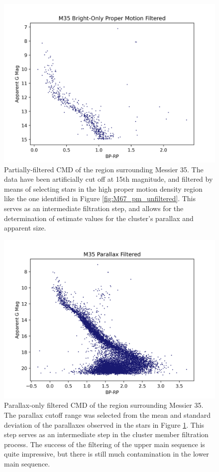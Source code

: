 \documentclass[onecolumn,table,xcdraw,super]{aastex631}
\begin{document}
\begin{figure}[]
    \centering
      \includegraphics[width=4.75in]{figures/M35_cmd_bright_filtered.png}
    \caption{Partially-filtered CMD of the region surrounding Messier 35. The data have been artificially cut off at 15th magnitude, and filtered by means of selecting stars in the high proper motion density region like the one identified in Figure \ref{fig:M67_pm_unfiltered}. This serves as an intermediate filtration step, and allows for the determination of estimate values for the cluster's parallax and apparent size.}
    \label{fig:M35_cmd_bright_filtered}
\end{figure}

\begin{figure}[]
    \centering
      \includegraphics[width=4.75in]{figures/M35_cmd_parallax_filtered.png}
    \caption{Parallax-only filtered CMD of the region surrounding Messier 35. The parallax cutoff range was selected from the mean and standard deviation of the parallaxes observed in the stars in Figure \ref{fig:M35_cmd_bright_filtered}. This step serves as an intermediate step in the cluster member filtration process. The success of the filtering of the upper main sequence is quite impressive, but there is still much contamination in the lower main sequence.}
    \label{fig:M35_cmd_filtered_par}
\end{figure}
\end{document}
